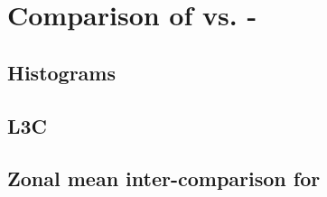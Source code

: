 \documentclass[a4paper,11pt]{article}
\begin{document}
\title{\doctitle}
\author{\docauthor}
\date{\today}
\maketitle
\tableofcontents
\newpage


%
%
%
%
%


%

\FloatBarrier
\section{Comparison of {\era} vs. {\cci}-{\fv}}\label{sec:sim_vs_obs}
\subsection{Histograms}



\FloatBarrier
\subsection{L3C}


\FloatBarrier
\subsection{Zonal mean inter-comparison for \MonthYear}


\newpage

% 

\end{document}
